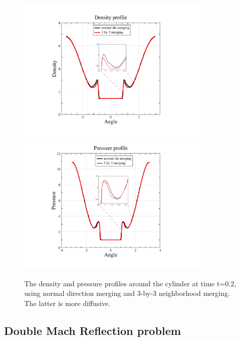 \begin{figure}
\begin{center}
\hspace*{-.5in}
\includegraphics[height=2.7in,trim=90 70 220 60,clip]{figs/densityWithZoom.pdf}
\hspace*{.3in}
\includegraphics[height=2.7in,trim=120 70 230 50,clip]{figs/pressureWithZoom.pdf}
\caption{\sf The density and pressure profiles around the cylinder at time
t=0.2,  using normal direction merging and 3-by-3 neighborhood merging.
The latter is more diffusive.}
\label{fig:cyl2}
\end{center}
\end{figure}

\subsection{Double Mach Reflection problem}

